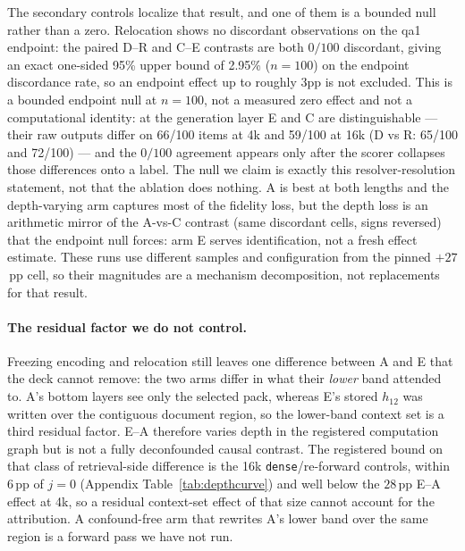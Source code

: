 The secondary controls localize that result, and one of them is a bounded null
rather than a zero.  Relocation shows no discordant observations on the qa1
endpoint: the paired D--R and C--E contrasts are both $0/100$ discordant, giving
an exact one-sided 95\% upper bound of 2.95\% ($n{=}100$) on the endpoint
discordance rate, so an endpoint effect up to roughly 3pp is not excluded.  This
is a bounded endpoint null at $n{=}100$, not a measured zero effect and not a
computational identity: at the generation layer E and C are distinguishable ---
their raw outputs differ on 66/100 items at 4k and 59/100 at 16k (D vs R: 65/100
and 72/100) --- and the $0/100$ agreement appears only after the scorer collapses
those differences onto a label.  The null we claim is exactly this
resolver-resolution statement, not that the ablation does nothing.  A is best at
both lengths and the depth-varying arm captures most of the fidelity loss, but the
depth loss is an arithmetic mirror of the A-vs-C contrast (same discordant cells,
signs reversed) that the endpoint null forces: arm E serves identification, not a
fresh effect estimate.  These runs use different samples and configuration from
the pinned $+27$\,pp cell, so their magnitudes are a mechanism decomposition, not
replacements for that result.

\paragraph{The residual factor we do not control.}
Freezing encoding and relocation still leaves one difference between A and E that
the deck cannot remove: the two arms differ in what their \emph{lower} band
attended to.  A's bottom layers see only the selected pack, whereas E's stored
$h_{12}$ was written over the contiguous document region, so the lower-band
context set is a third residual factor.  E--A therefore varies depth in the
registered computation graph but is not a fully deconfounded causal contrast.
The registered bound on that class of retrieval-side difference is the 16k
\texttt{dense}/re-forward controls, within $6$\,pp of $j{=}0$ (Appendix
Table~\ref{tab:depthcurve}) and well below the $28$\,pp E--A effect at 4k, so a
residual context-set effect of that size cannot account for the attribution.  A
confound-free arm that rewrites A's lower band over the same region is a forward
pass we have not run.

